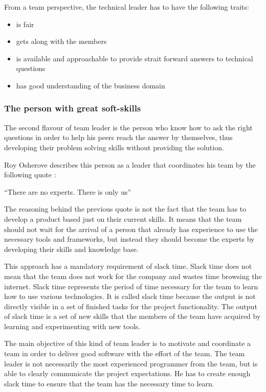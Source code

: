 From a team perspective, the technical leader has to have the following traits:

\begin{itemize}
\item is fair
\item gets along with the members
\item is available and approachable to provide strait forward answers to technical questions
\item has good understanding of the business domain
\end{itemize}


\subsubsection{The person with great soft-skills}

The second flavour of team leader is the person who know how to ask the right questions in order to help his peers reach the answer by themselves, thus developing their problem solving skills without providing the solution.

Roy Osherove describes this person as a leader that coordinates his team by the following quote \cite{notes-to-a-software-team-leader}:

\begin{displayquote}
``There are no experts. There is only us''
\end{displayquote} 

The reasoning behind the previous quote is not the fact that the team has to develop a product based just on their current skills. It means that the team should not wait for the arrival of a person that already has experience to use the necessary tools and frameworks, but instead they should become the experts by developing their skills and knowledge base. 

This approach has a mandatory requirement of slack time. Slack time does not mean that the team does not work for the company and wastes time browsing the internet. Slack time represents the period of time necessary for the team to learn how to use various technologies. It is called slack time because the output is not directly visible in a set of finished tasks for the project functionality. The output of slack time is a set of new skills that the members of the team have acquired by learning and experimenting with new tools.

The main objective of this kind of team leader is to motivate and coordinate a team in order to deliver good software with the effort of the team. The team leader is not necessarily the most experienced programmer from the team, but is able to clearly communicate the project expectations. He has to create enough slack time to ensure that the team has the necessary time to learn.

